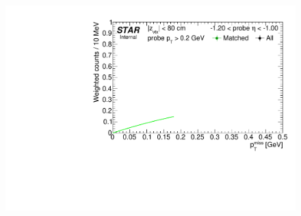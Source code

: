 \begin{figure}[ht]
{  \includegraphics[width=\linewidth,page=9]{graphics/correctionsToEff/TOF_tagAndProbe/Fitting_effVsEta_data.CPT2.pdf}

}
\end{figure}
